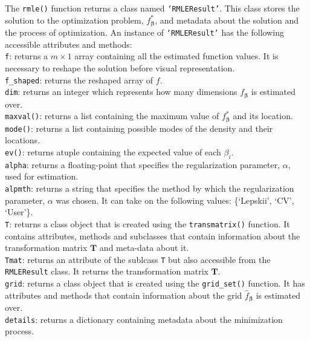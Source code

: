 \documentclass[a4paper,12pt]{article}
\newcommand{\bbeta}{{\boldsymbol{\beta}}}
\begin{document}
The \texttt{rmle()} function returns a class named \texttt{`RMLEResult'}. This class stores the solution to the optimization problem, $f_\bbeta^{*}$, and metadata about the solution and the process of optimization. An instance of \texttt{`RMLEResult'} has the following accessible attributes and methods:\\
\noindent \texttt{f}: returns a $m \times 1$ array containing all the estimated function values. It is necessary to reshape the solution before visual representation.\\
\noindent \texttt{f\_shaped}: returns the reshaped array of $f$.\\
\noindent \texttt{dim}: returns an integer which represents how many dimensions $f_\bbeta$ is estimated over.\\
\noindent \texttt{maxval()}: returns a list containing the maximum value of $f_\bbeta^{*}$ and its location. \\
\noindent \texttt{mode()}: returns a list containing possible modes of the density and their locations. \\
\noindent \texttt{ev()}: returns atuple containing the expected value of each $\beta_i$. \\
\noindent \texttt{alpha}: returns a floating-point that specifies the regularization parameter, $\alpha$, used for estimation.\\
\noindent \texttt{alpmth}: returns a string that specifies the method by which the regularization parameter, $\alpha$ was chosen. It can take on the following values: \{`Lepskii', `CV',  `User'\}.\\
\noindent \texttt{T}: returns a class object that is created using the \texttt{transmatrix()} function. It contains attributes, methods and subclasses that contain information about the transformation matrix $\mathbf{T}$ and meta-data about it. \\
\noindent \texttt{Tmat}: returns an attribute of the sublcass \texttt{T} but also accessible from the \texttt{RMLEResult} class. It returns the transformation matrix $\mathbf{T}$. \\ 
\noindent  \texttt{grid}: returns a class object that is created using the \texttt{grid\_set()} function. It has attributes and methods that contain information about the grid $\hat{f}_\bbeta$ is estimated over. \\
\noindent \texttt{details}: returns a dictionary containing metadata about the minimization process. \\
\end{document}
